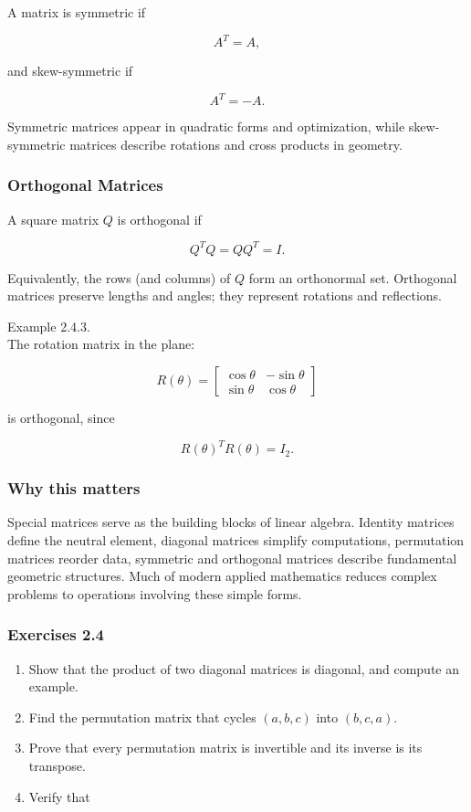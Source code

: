\documentclass[
  12pt,
  a4paper,
]{article}
\begin{document}
A matrix is symmetric if

\[A^T = A,\]

and skew-symmetric if

\[A^T = -A.\]

Symmetric matrices appear in quadratic forms and optimization, while
skew-symmetric matrices describe rotations and cross products in
geometry.

\subsubsection{Orthogonal Matrices}\label{orthogonal-matrices}

A square matrix \(Q\) is orthogonal if

\[Q^T Q = QQ^T = I.\]

Equivalently, the rows (and columns) of \(Q\) form an orthonormal set.
Orthogonal matrices preserve lengths and angles; they represent
rotations and reflections.

Example 2.4.3.\\
The rotation matrix in the plane:

\[R(\theta) = \begin{bmatrix}
\cos\theta & -\sin\theta \\
\sin\theta & \cos\theta
\end{bmatrix}\]

is orthogonal, since

\[R(\theta)^T R(\theta) = I_2.\]

\subsubsection{Why this matters}\label{why-this-matters-7}

Special matrices serve as the building blocks of linear algebra.
Identity matrices define the neutral element, diagonal matrices simplify
computations, permutation matrices reorder data, symmetric and
orthogonal matrices describe fundamental geometric structures. Much of
modern applied mathematics reduces complex problems to operations
involving these simple forms.

\subsubsection{Exercises 2.4}\label{exercises-24}

\begin{enumerate}
\def\labelenumi{\arabic{enumi}.}
\item
  Show that the product of two diagonal matrices is diagonal, and
  compute an example.
\item
  Find the permutation matrix that cycles \((a,b,c)\) into \((b,c,a)\).
\item
  Prove that every permutation matrix is invertible and its inverse is
  its transpose.
\item
  Verify that
\end{enumerate}
\end{document}
